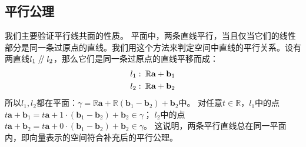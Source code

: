 \documentclass[12pt,UTF8]{ctexbook}
\renewcommand\parallel{\mathrel{/\mskip-4mu/}}
\begin{document}
\begin{appendix}
\section{平行公理}
我们主要验证平行线共面的性质。
平面中，两条直线平行，当且仅当它们的线性部分是同一条过原点的直线。我们用这个方法来判定空间中直线的平行关系。设有两直线$l_1\parallel l_2$，那么它们是同一条过原点的直线平移而成：
\begin{align}
l_1: & \,\,\, \mathbb{R}\mathbf{a} + \mathbf{b}_1 \notag \\
l_2: & \,\,\, \mathbb{R}\mathbf{a} + \mathbf{b}_2\notag
\end{align}
所以$l_1,l_2$都在平面：$\gamma = \mathbb{R}\mathbf{a} + \mathbb{R}(\mathbf{b}_1 - \mathbf{b}_2) + \mathbf{b}_2$中。
对任意$t\in\mathbb{R}$，$l_1$中的点$t\mathbf{a} + \mathbf{b}_1 = t\mathbf{a} + 1\cdot(\mathbf{b}_1 - \mathbf{b}_2) + \mathbf{b}_2 \in \gamma$；
$l_2$中的点$t\mathbf{a} + \mathbf{b}_2 = t\mathbf{a} + 0\cdot(\mathbf{b}_1 - \mathbf{b}_2) + \mathbf{b}_2 \in \gamma$。
这说明，两条平行直线总在同一平面内，即向量表示的空间符合补充后的平行公理。

\end{appendix}
\end{document}
